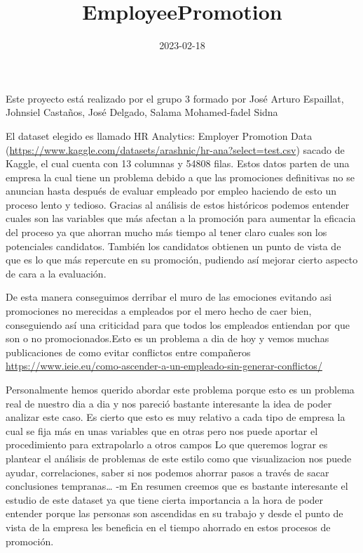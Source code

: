 \documentclass[
]{article}
\title{EmployeePromotion}
\author{}
\date{\vspace{-2.5em}2023-02-18}
\begin{document}
\maketitle

Este proyecto está realizado por el grupo 3 formado por José Arturo
Espaillat, Johnsiel Castaños, José Delgado, Salama Mohamed-fadel Sidna

El dataset elegido es llamado HR Analytics: Employer Promotion Data
(\url{https://www.kaggle.com/datasets/arashnic/hr-ana?select=test.csv})
sacado de Kaggle, el cual cuenta con 13 columnas y 54808 filas. Estos
datos parten de una empresa la cual tiene un problema debido a que las
promociones definitivas no se anuncian hasta después de evaluar empleado
por empleo haciendo de esto un proceso lento y tedioso. Gracias al
análisis de estos históricos podemos entender cuales son las variables
que más afectan a la promoción para aumentar la eficacia del proceso ya
que ahorran mucho más tiempo al tener claro cuales son los potenciales
candidatos. También los candidatos obtienen un punto de vista de que es
lo que más repercute en su promoción, pudiendo así mejorar cierto
aspecto de cara a la evaluación.

De esta manera conseguimos derribar el muro de las emociones evitando
asi promociones no merecidas a empleados por el mero hecho de caer bien,
conseguiendo así una criticidad para que todos los empleados entiendan
por que son o no promocionados.Esto es un problema a dia de hoy y vemos
muchas publicaciones de como evitar conflictos entre compañeros
\url{https://www.ieie.eu/como-ascender-a-un-empleado-sin-generar-conflictos/}

Personalmente hemos querido abordar este problema porque esto es un
problema real de nuestro dia a dia y nos pareció bastante interesante la
idea de poder analizar este caso. Es cierto que esto es muy relativo a
cada tipo de empresa la cual se fija más en unas variables que en otras
pero nos puede aportar el procedimiento para extrapolarlo a otros campos
Lo que queremos lograr es plantear el análisis de problemas de este
estilo como que visualizacion nos puede ayudar, correlaciones, saber si
nos podemos ahorrar pasos a través de sacar conclusiones
tempranas\ldots{} -m En resumen creemos que es bastante interesante el
estudio de este dataset ya que tiene cierta importancia a la hora de
poder entender porque las personas son ascendidas en su trabajo y desde
el punto de vista de la empresa les beneficia en el tiempo ahorrado en
estos procesos de promoción.
\end{document}
